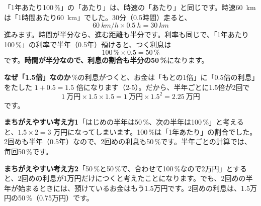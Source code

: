 \begin{omoidasou}
\end{omoidasou}

\clearpage


\label{bk:5-14:bunkatsu}「1年あたり100\,\%」の「あたり」は、時速の「あたり」と同じです。時速\qty{60}{km}は「1時間あたり\qty{60}{km}」でした。30分（0.5時間）走ると、
\[ \qty{60}{km/h}\times\qty{0.5}{h}=\qty{30}{km} \]
進みます。時間が半分なら、進む距離も半分です。利率も同じで、「1年あたり100\,\%」の利率で半年（0.5年）預けると、つく利息は
\[ 100\,\%\times0.5=50\,\% \]
です。\textbf{時間が半分なので、利息の割合も半分の50\,\%}になります。

\noindent\textbf{なぜ「1.5倍」なのか}\,\%の利息がつくと、お金は「もとの1倍」に「0.5倍の利息」をたした $1+0.5=1.5$ 倍になります（2-5）。だから、半年ごとに1.5倍が2回で
\[ 1\ \text{万円}\times1.5\times1.5=1\ \text{万円}\times1.5^2=2.25\ \text{万円} \]
です。

\noindent\textbf{まちがえやすい考え方1}\quad 「はじめの半年は50\,\%、次の半年は100\,\%」と考えると、$1.5\times2=3$ 万円になってしまいます。100\,\%は「1年あたり」の割合でした。2回めも半年（0.5年）なので、2回めの利息も50\,\%です。半年ごとの計算では、毎回50\,\%です。

\noindent\textbf{まちがえやすい考え方2}\quad 「50\,\%と50\,\%で、合わせて100\,\%なので2万円」とすると、2回めの利息が1万円だけにつくと考えたことになります。でも、2回めの半年が始まるときには、預けているお金はもう1.5万円です。2回めの利息は、1.5万円の50\,\%（0.75万円）です。


